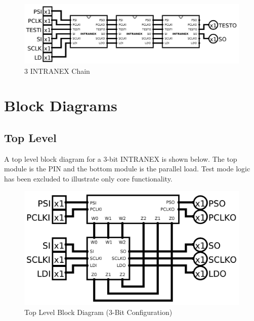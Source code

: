 \documentclass{article}
\begin{document}
    \begin{figure}[H]
        \centering
        \includegraphics[width=\linewidth]{../../logisim/chain.png}
        \caption{3 INTRANEX Chain}
    \end{figure}

\section{Block Diagrams}

    \subsection{Top Level}
    A top level block diagram for a 3-bit INTRANEX is shown below. The top
    module is the PIN and the bottom module is the parallel load. Test mode
    logic has been excluded to illustrate only core functionality.
    \begin{figure}[H]
        \centering
        \includegraphics[width=0.75\linewidth]{../../logisim/top.png}
        \caption{Top Level Block Diagram (3-Bit Configuration)}
        \label{fig:block}
    \end{figure}
\end{document}
